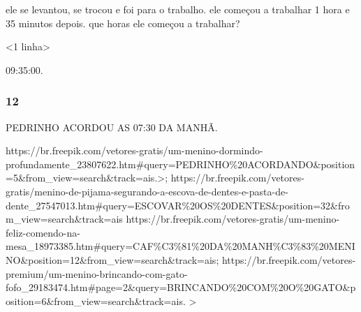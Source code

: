 ele se levantou, se trocou e foi para o trabalho. ele começou a
trabalhar 1 hora e 35 minutos depois. que horas ele começou a trabalhar?

\textless{}1 linha\textgreater{}

09:35:00.

\subsubsection{12}\label{section-50}

PEDRINHO ACORDOU AS 07:30 DA MANHÃ.

https://br.freepik.com/vetores-gratis/um-menino-dormindo-profundamente\_23807622.htm\#query=PEDRINHO\%20ACORDANDO\&position=5\&from\_view=search\&track=ais.\textgreater{};
https://br.freepik.com/vetores-gratis/menino-de-pijama-segurando-a-escova-de-dentes-e-pasta-de-dente\_27547013.htm\#query=ESCOVAR\%20OS\%20DENTES\&position=32\&from\_view=search\&track=ais
https://br.freepik.com/vetores-gratis/um-menino-feliz-comendo-na-mesa\_18973385.htm\#query=CAF\%C3\%81\%20DA\%20MANH\%C3\%83\%20MENINO\&position=12\&from\_view=search\&track=ais;
https://br.freepik.com/vetores-premium/um-menino-brincando-com-gato-fofo\_29183474.htm\#page=2\&query=BRINCANDO\%20COM\%20O\%20GATO\&position=6\&from\_view=search\&track=ais.
\textgreater{}

